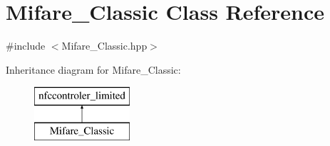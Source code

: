 \hypertarget{class_mifare___classic}{}\section{Mifare\+\_\+\+Classic Class Reference}
\label{class_mifare___classic}


{\ttfamily \#include $<$Mifare\+\_\+\+Classic.\+hpp$>$}

Inheritance diagram for Mifare\+\_\+\+Classic\+:\begin{figure}[H]
\begin{center}
\leavevmode
\includegraphics[height=2.000000cm]{class_mifare___classic}
\end{center}
\end{figure}
